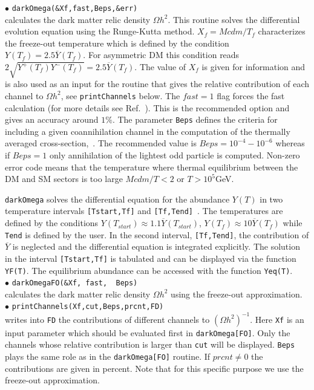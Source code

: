 \documentclass[12pt,a4paper]{article}
\begin{document}
 
\noindent 
$\bullet$ \verb|darkOmega(&Xf,fast,Beps,&err)|\\
calculates the dark matter relic density $\Omega h^2$. 
This routine  solves the differential evolution equation  using the Runge-Kutta method. 
$X_f=Mcdm/T_{f}$
characterizes the freeze-out temperature  which is defined by the
condition $Y(T_f)=2.5 \overline{Y}(T_f)$. For  asymmetric  DM this condition
reads $2\sqrt{Y^+(T_f)Y^-(T_f)}=2.5\overline{Y}(T_f)$.  The value of $X_f$ is given for
information and is also used as an input for the routine that
gives the relative contribution of each channel to $\Omega h^2$,
see \verb|printChannels|  below. The  $fast=1$ flag forces the
fast calculation (for more details see
Ref.~\cite{Belanger:2004yn}). This is the recommended option and
gives an accuracy around $1\%$. The parameter {\tt Beps} defines the
criteria for including a given coannihilation channel in the computation of the
thermally averaged cross-section,~\cite{Belanger:2004yn}.   The
recommended value is $Beps=10^{-4} - 10^{-6}$ whereas 
if $Beps=1$ only annihilation of the
lightest odd particle is computed. Non-zero error code means that the temperature where thermal equilibrium between the DM and SM sectors is too large  $Mcdm/T < 2$  or
$T>10^{5}$GeV. 

   
\verb|darkOmega| solves the differential equation for the abundance $Y(T)$   in  two  
temperature intervals {\tt [Tstart,Tf]}  and   {\tt [Tf,Tend]}~\cite{Belanger:2001fz}. The temperatures  are defined by the
conditions $Y(T_{start})\approx 1.1\overline{Y}(T_{start})$,
$Y(T_{f})\approx10\overline{Y}(T_{f})$ while  {\tt Tend} is defined by the
user. In the second interval,  {\tt [Tf,Tend]},  the contribution of  $\overline{Y}$
 is neglected and  the differential equation is integrated
explicitly. The solution in the interval {\tt [Tstart,Tf]}  is tabulated and can be displayed  via the
function {\tt YF(T)}. The equilibrium abundance can be accessed  with the function
{\tt Yeq(T)}. \\



\noindent
$\bullet$ \verb|darkOmegaFO(&Xf, fast,  Beps)|\\
calculates the  dark matter relic density $\Omega h^2$ using the freeze-out approximation.\\

\noindent
$\bullet$ \verb|printChannels(Xf,cut,Beps,prcnt,FD)|\\   
writes into \verb|FD| the  contributions  of different channels to $(\Omega
h^2)^{-1}$. Here \verb|Xf| is an input parameter which should
be  evaluated first in \verb|darkOmega[FO]|. Only  the channels whose
relative contribution is larger than  \verb|cut| will be displayed. \verb|Beps|
plays the same role as in the \verb|darkOmega[FO]| routine.
If $prcnt\ne 0$ the contributions are given in percent.
Note that  for this specific purpose  we use the
freeze-out approximation.\\
\end{document}
